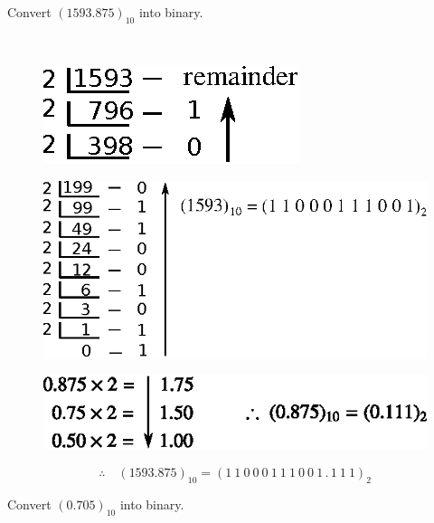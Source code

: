 \begin{problem}
Convert $(1593.875)_{10}$ into binary.
\end{problem}

\begin{solution}
~
\begin{figure}[H]
\centering
\includegraphics{chap5/div5a.eps}
\end{figure}
\begin{figure}[H]
\centering
\includegraphics{chap5/div5.eps}
\end{figure}
\begin{figure}[H]
\centering
\includegraphics{chap5/div6.eps}
\end{figure}
$$
\therefore\quad (1593.875)_{10}=(1~1~0~0~0~1~1~1~0~0~1\,.\,1~1~1)_{2}
$$
\end{solution}

\begin{problem}\label{prob5.7}
Convert $(0.705)_{10}$ into binary.
\end{problem}

